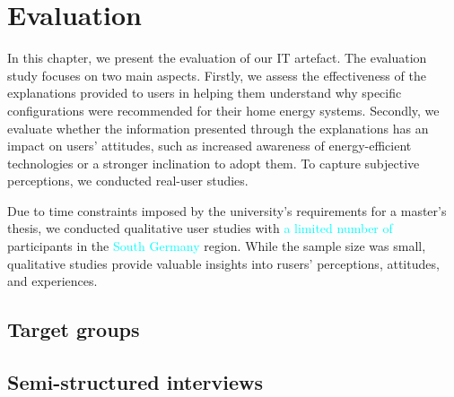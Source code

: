 \chapter{Evaluation}

In this chapter, we present the evaluation of our IT artefact. 
The evaluation study focuses on two main aspects. 
Firstly, we assess the effectiveness of the explanations provided to users in helping them understand why specific configurations were recommended for their home energy systems.
Secondly, we evaluate whether the information presented through the explanations has an impact on users' attitudes, such as increased awareness of energy-efficient technologies or a stronger inclination to adopt them. 
To capture subjective perceptions, we conducted real-user studies. 

Due to time constraints imposed by the university's requirements for a master's thesis, we conducted qualitative user studies with \textcolor{cyan}{a limited number of} participants in the \textcolor{cyan}{South Germany} region. 
While the sample size was small, qualitative studies provide valuable insights into rusers' perceptions, attitudes, and experiences.


\section{Target groups}



\section{Semi-structured interviews}

